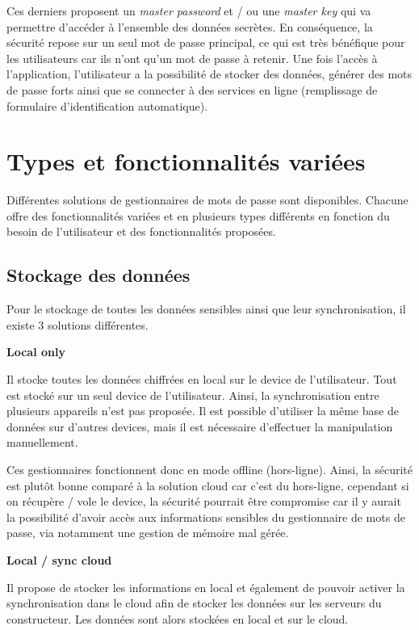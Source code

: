 Ces derniers proposent un \textit{master password} et / ou une \textit{master key} qui va permettre d'accéder à l'ensemble des données secrètes. En conséquence, la sécurité repose sur un seul mot de passe principal, ce qui est très bénéfique pour les utilisateurs car ils n'ont qu'un mot de passe à retenir. Une fois l'accès à l'application, l'utilisateur a la possibilité de stocker des données, générer des mots de passe forts ainsi que se connecter à des services en ligne (remplissage de formulaire d'identification automatique).

\section{Types et fonctionnalités variées}

Différentes solutions de gestionnaires de mots de passe sont disponibles. Chacune offre des fonctionnalités variées et en plusieurs types différents en fonction du besoin de l'utilisateur et des fonctionnalités proposées. 

\subsection{Stockage des données}

Pour le stockage de toutes les données sensibles ainsi que leur synchronisation, il existe 3 solutions différentes.

\textbf{Local only} 

Il stocke toutes les données chiffrées en local sur le device de l'utilisateur. Tout est stocké sur un seul device de l'utilisateur. Ainsi, la synchronisation entre plusieurs appareils n'est pas proposée. Il est possible d'utiliser la même base de données sur d'autres devices, mais il est nécessaire d'effectuer la manipulation manuellement. 

Ces gestionnaires fonctionnent donc en mode offline (hors-ligne). Ainsi, la sécurité est plutôt bonne comparé à la solution cloud car c'est du hors-ligne, cependant si on récupère / vole le device, la sécurité pourrait être compromise car il y aurait la possibilité d'avoir accès aux informations sensibles du gestionnaire de mots de passe, via notamment une gestion de mémoire mal gérée. 

\textbf{Local / sync cloud} 

Il propose de stocker les informations en local et également de pouvoir activer la synchronisation dans le cloud afin de stocker les données sur les serveurs du constructeur. Les données sont alors stockées en local et sur le cloud. 

